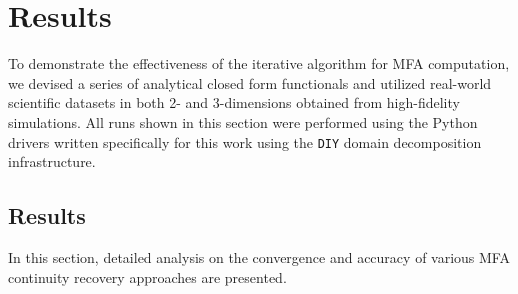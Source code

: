 
\section{Results}
\label{sec:results}

To demonstrate the effectiveness of the iterative algorithm for MFA computation, we devised a series of analytical closed form functionals and utilized real-world scientific datasets in both 2- and 3-dimensions obtained from high-fidelity simulations. All runs shown in this section were performed using the Python drivers written specifically for this work using the \texttt{DIY} domain decomposition infrastructure.

%


\subsection{ Results}\label{sec:results-1d}

In this section, detailed analysis on the convergence and accuracy of various MFA continuity recovery approaches are presented. 

